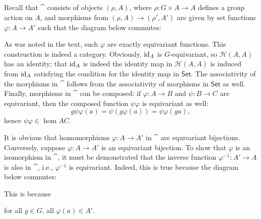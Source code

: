 \documentclass[12pt]{article}
\begin{document}
\setcounter{subsection}{7} 
\subsection{} 
Recall that $\cat$ consists of objects $(\rho, A)$, where $\rho:G \times A \rightarrow A$ defines a group action on $A$, and morphisms from $(\rho, A) \rightarrow (\rho', A')$ are given by set functions $\varphi: A \rightarrow A'$ such that the diagram below commutes:
\begin{center}
\end{center}
As was noted in the text, such $\varphi$ are exactly equivariant functions. 
This construction is indeed a category. 
Obviously, $\text{id}_{A}$ is $G$-equivariant, so $\mathcal{H}(A, A)$ has an identity; 
that $\text{id}_{A}$ is indeed the identity map in $\mathcal{H}(A, A)$ is induced from $\text{id}_{A}$ satisfying the condition for the identity map in $\mathsf{Set}$. 
The associativity of the morphisms in $\cat$ follows from the associativity of morphisms in $\mathsf{Set}$ as well. 
Finally, morphisms in $\cat$ can be composed: 
if $\varphi:A \rightarrow B$ and $\psi: B \rightarrow C$ are equivariant, then the composed function $\psi \varphi$ is equivariant as well: 
$$g \psi \varphi(a) = \psi(g \varphi(a)) = \psi \varphi(ga),$$
hence $\psi \varphi \in \hom{A}{C}$. 

It is obvious that homomorphisms $\varphi: A \rightarrow A'$ in $\cat$ are equivariant bijections. 
Conversely, suppose $\varphi: A \rightarrow A'$ is an equivariant bijection. 
To show that $\varphi$ is an isomorphism in $\cat$, it must be demonstrated that the inverse function $\varphi^{-1}:A' \rightarrow A$ is also in $\cat$, i.e., $\varphi^{-1}$ is equivariant.  
Indeed, this is true because the diagram below commutes: 
\begin{center}
\end{center}
This is because 
\begin{center}
\end{center}
for all $g \in G$, all $\varphi(a) \in A'$. 
\end{document}
